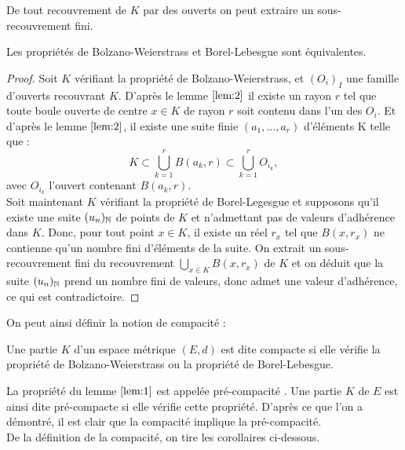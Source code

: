 \begin{prop}
De tout recouvrement de $K$ par des ouverts on peut extraire un sous-recouvrement fini.
\end{prop}

\begin{thm}
Les propriétés de Bolzano-Weierstrass et Borel-Lebesgue sont équivalentes.
\end{thm}

\begin{proof}
Soit $K$ vérifiant la propriété de Bolzano-Weierstrass, et $(O_i)_I$ une famille d'ouverts recouvrant $K$.
D'après le lemme $\ref{lem:2}$ il existe un rayon $r$ tel que toute boule ouverte de centre $x \in K$ de rayon $r$ soit contenu dans l'un
des $O_i$. Et d'après le lemme $\ref{lem:2}$, il existe une suite finie $(a_1, \dots, a_r)$ d'éléments K telle que :
\[  K \subset \bigcup_{k=1}^r B(a_k, r) \subset \bigcup_{k=1}^r O_{i_k} , \]
avec $O_{i_k}$ l'ouvert contenant $B(a_k, r)$. \\

Soit maintenant $K$ vérifiant la propriété de Borel-Legesgue et supposons qu'il existe une suite $(u_n)_{\mathbb{N}}$ de points de $K$ et
n'admettant pas de valeurs d'adhérence dans $K$. 
Donc, pour tout point $x \in K$, il existe un réel $r_x$ tel que $B(x, r_x)$ ne contienne qu'un nombre fini d'éléments de la suite.
On extrait un sous-recouvrement fini du recouvrement $\bigcup_{x \in K} B(x, r_x)$ de $K$ et on déduit que la suite $(u_n)_{\mathbb{N}}$ prend
un nombre fini de valeurs, donc admet une valeur d'adhérence, ce qui est contradictoire.
\end{proof}

On peut ainsi définir la notion de compacité :

\begin{defn}
Une partie $K$ d'un espace métrique $(E,d)$ est dite compacte si elle vérifie la propriété de Bolzano-Weierstrass ou la propriété de 
Borel-Lebesgue.
\end{defn}

\begin{rmq}
La propriété du lemme $\ref{lem:1}$ est appelée \og pré-compacité \fg{}. 
Une partie $K$ de $E$ est ainsi dite pré-compacte si elle vérifie cette propriété.
D'après ce que l'on a démontré, il est clair que la compacité implique la pré-compacité. \\
De la définition de la compacité, on tire les corollaires ci-dessous.
\end{rmq}

